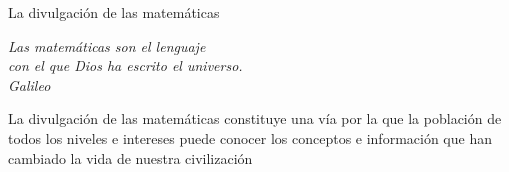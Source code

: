 \documentclass{article}
\begin{document}
\begin{center}
    La divulgación de las matemáticas
\end{center}

\begin{flushright}
    \textit{Las matemáticas son el lenguaje \\
    con el que Dios ha escrito el universo. \\
    Galileo}
\end{flushright}

\begin{flushleft}
    La divulgación de las matemáticas constituye una vía por la que
la población de todos los niveles e intereses puede conocer los 
conceptos e información que han cambiado la vida de nuestra 
civilización
\end{flushleft}
\end{document}
